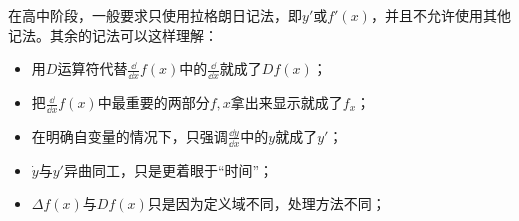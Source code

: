 在高中阶段，一般要求只使用拉格朗日记法，即$y'$或$f'(x)$，并且不允许使用其他记法。其余的记法可以这样理解：
\begin{itemize}
\item 用$D$运算符代替$\displaystyle\frac{\dd}{\dd x}f(x)$中的$\displaystyle\frac{\dd}{\dd x}$就成了$Df(x)$；
\item 把$\displaystyle\frac{\dd}{\dd x}f(x)$中最重要的两部分$f,x$拿出来显示就成了$f_x$；
\item 在明确自变量的情况下，只强调$\displaystyle\frac{\dd y}{\dd x}$中的$y$就成了$y'$；
\item $\dot{y}$与$y'$异曲同工，只是更着眼于“时间”；
\item $\Delta f(x)$与$Df(x)$只是因为定义域不同，处理方法不同；
\end{itemize}

